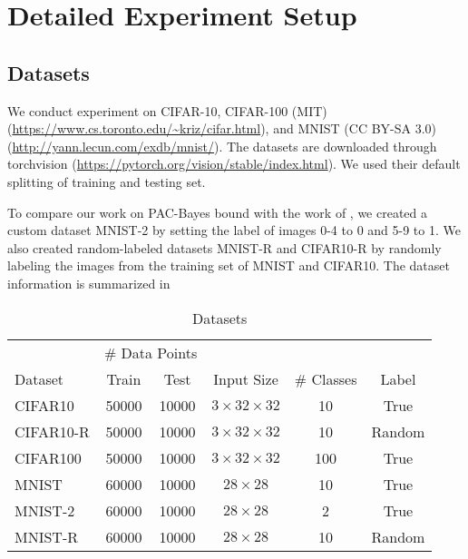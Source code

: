 \newpage
\section{Detailed Experiment Setup}
\label{sec:appendix_exp_setup}
\subsection{Datasets}
\label{sec:appendix_exp_dataset}
We conduct experiment on CIFAR-10, CIFAR-100 (MIT) \citep{Krizhevsky09learningmultiple} (\url{https://www.cs.toronto.edu/~kriz/cifar.html}), and MNIST (CC BY-SA 3.0) \citep{lecun1998gradient} (\url{http://yann.lecun.com/exdb/mnist/}). The datasets are downloaded through torchvision \citep{NEURIPS2019_9015} (\url{https://pytorch.org/vision/stable/index.html}). We used their default splitting of training and testing set.

To compare our work on PAC-Bayes bound with the work of \citet{dziugaite2017computing}, we created a custom dataset MNIST-2 by setting the label of images 0-4 to 0 and 5-9 to 1.
We also created random-labeled datasets MNIST-R and CIFAR10-R by randomly labeling the images from the training set of MNIST and CIFAR10.
The dataset information is summarized in 
\begin{table}[h]
\small
  \centering
  \caption{Datasets}
  \vskip 0.1in
    \begin{center}

    \begin{tabular}{lccccc}
    \toprule
    &   \multicolumn{2}{c}{\# Data Points}    &    & &     \\
    Dataset & Train & Test & Input Size & \# Classes & Label \\
    \midrule
    CIFAR10 & 50000 & 10000 & $3\times32\times32$ & 10 & True \\
    CIFAR10-R & 50000 & 10000 & $3\times32\times32$ & 10 & Random \\
    CIFAR100 & 50000 & 10000 & $3\times32\times32$ & 100 & True \\
    MNIST & 60000 & 10000 & $28\times28$ & 10 & True \\
    MNIST-2 & 60000 & 10000 & $28\times28$ & 2 & True \\
    MNIST-R & 60000 & 10000 & $28\times28$ & 10 & Random \\\bottomrule
    \end{tabular}
\end{center}
  \label{tab:appendix_dataset}%
\end{table}%

